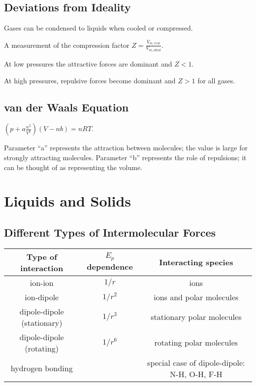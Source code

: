 \documentclass[a4paper,12pt]{article}
\begin{document}
\subsection{Deviations from Ideality}
Gases can be condensed to liquids when cooled or compressed.\par
A measurement of the compression factor $Z=\frac{V_{m, real}}{V_{m, ideal}}$.\par
At low pressures the attractive forces are dominant and $Z<1$.\par
At high pressures, repulsive forces become dominant and $Z>1$ for all gases.\par
\subsection{van der Waals Equation} 
$(p+a\frac{n^{2}}{V^{2}})(V-nb)=nRT$.\par
Parameter “a” represents the attraction between molecules; the value is large for strongly attracting molecules.
Parameter “b” represents the role of repulsions; it can be thought of as representing the volume.

\newpage
\section{Liquids and Solids}
\subsection{Different Types of Intermolecular Forces}
\begin{center}
  \begin{tabular}{ccc}
    \toprule
    Type of interaction & $E_{p}$ dependence & Interacting species \\
    \hline
    ion-ion    & $1/r$  & ions  \\
    ion-dipole  & $1/r^{2}$  & ions and polar molecules  \\
    dipole-dipole (stationary)  & $1/r^{3}$  & stationary polar molecules  \\
    dipole-dipole (rotating)  & $1/r^{6}$  &rotating polar molecules  \\
    hydrogen bonding &   &special case of dipole-dipole: N-H, O-H, F-H  \\
    \bottomrule
  \end{tabular}
\end{center}
\end{document}
